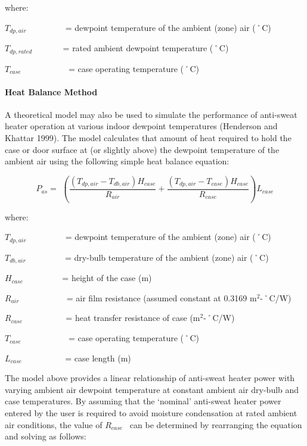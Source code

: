 where:

\({T_{dp,air}}\) ~~~~~~~~ = dewpoint temperature of the ambient (zone) air (˚C)

\({T_{dp,rated}}\) ~~~~~~ = rated ambient dewpoint temperature (˚C)

\({T_{case}}\) ~~~~~~~~~~ = case operating temperature (˚C)

\paragraph{Heat Balance Method}\label{heat-balance-method}

A theoretical model may also be used to simulate the performance of anti-sweat heater operation at various indoor dewpoint temperatures (Henderson and Khattar 1999). The model calculates that amount of heat required to hold the case or door surface at (or slightly above) the dewpoint temperature of the ambient air using the following simple heat balance equation:

\begin{equation}
{P_{as}} = \,\,\left( {\frac{{\left( {{T_{dp,air}} - {T_{db,air}}} \right){H_{case}}}}{{{R_{air}}}} + \frac{{\left( {{T_{dp,air}} - {T_{case}}} \right){H_{case}}}}{{{R_{case}}}}} \right){L_{case}}
\end{equation}

where:

\({T_{dp,air}}\) ~~~~~~~~ = dewpoint temperature of the ambient (zone) air (˚C)

\({T_{db,air}}\) ~~~~~~~~ = dry-bulb temperature of the ambient (zone) air (˚C)

\({H_{case}}\) ~~~~~~~~ = height of the case (m)

\({R_{air}}\) ~~~~~~~~~~ = air film resistance (assumed constant at 0.3169 m\(^{2}\)-˚C/W)

\({R_{case}}\) ~~~~~~~~~ = heat transfer resistance of case (m\(^{2}\)-˚C/W)

\({T_{case}}\) ~~~~~~~~~~ = case operating temperature (˚C)

\({L_{case}}\) ~~~~~~~~~ = case length (m)

The model above provides a linear relationship of anti-sweat heater power with varying ambient air dewpoint temperature at constant ambient air dry-bulb and case temperatures. By assuming that the `nominal' anti-sweat heater power entered by the user is required to avoid moisture condensation at rated ambient air conditions, the value of \({R_{case}}\) ~can be determined by rearranging the equation and solving as follows:


